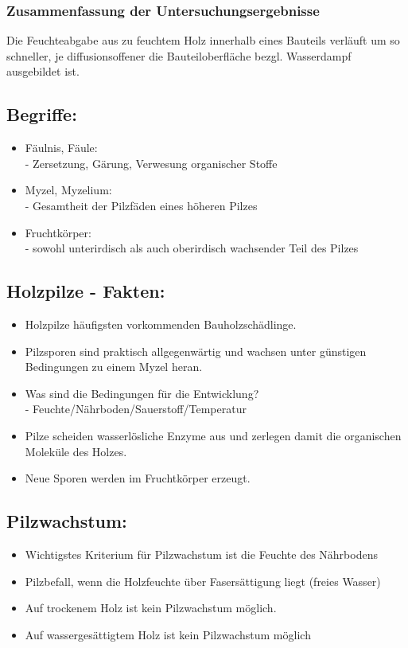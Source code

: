 \documentclass[fleqn,twoside]{article}
\begin{document}
        \subsubsection{Zusammenfassung der Untersuchungsergebnisse}
        Die Feuchteabgabe aus zu feuchtem Holz innerhalb eines Bauteils verläuft um so schneller, je diffusionsoffener die Bauteiloberfläche bezgl. Wasserdampf ausgebildet ist.

    
    \subsection{Begriffe:}
        \begin{itemize}
            \item Fäulnis, Fäule:\\
                - Zersetzung, Gärung, Verwesung organischer Stoffe
            \item Myzel, Myzelium:\\
                - Gesamtheit der Pilzfäden eines höheren Pilzes
            \item Fruchtkörper:\\
                - sowohl unterirdisch als auch oberirdisch wachsender Teil des Pilzes
        \end{itemize}
    
    \subsection{Holzpilze - Fakten:}
        \begin{itemize}
            \item Holzpilze häufigsten vorkommenden Bauholzschädlinge.
            \item Pilzsporen sind praktisch allgegenwärtig und wachsen unter günstigen Bedingungen zu einem Myzel heran.
            \item Was sind die Bedingungen für die Entwicklung?\\
            - Feuchte/Nährboden/Sauerstoff/Temperatur
            \item Pilze scheiden wasserlösliche Enzyme aus und zerlegen damit die organischen Moleküle des Holzes.
            \item Neue Sporen werden im Fruchtkörper erzeugt.
        \end{itemize}
        
    \subsection{Pilzwachstum:}
        \begin{itemize}
            \item Wichtigstes Kriterium für Pilzwachstum ist die Feuchte des Nährbodens
            \item Pilzbefall, wenn die Holzfeuchte über Fasersättigung liegt (freies Wasser)
            \item Auf trockenem Holz ist kein Pilzwachstum möglich.
            \item Auf wassergesättigtem Holz ist kein Pilzwachstum möglich
        \end{itemize}
        
\end{document}
